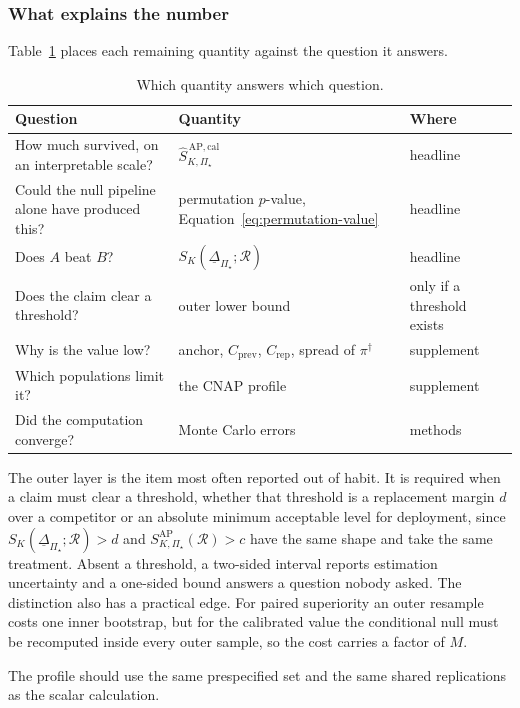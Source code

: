\documentclass[11pt]{article}
\newcommand{\Regime}{\mathcal{R}}
\newcommand{\PSet}{\Pi_\star}
\newcommand{\RobDelta}{\underline{\Delta}_{\PSet}}
\newcommand{\SRob}{S_{K,\PSet}^{\mathrm{AP}}(\Regime)}
\newcommand{\SRobCalHat}{\widehat S_{K,\PSet}^{\,\mathrm{AP,cal}}}
\theoremstyle{remark}
\begin{document}
\subsubsection*{What explains the number}

Table~\ref{tab:reporting} places each remaining quantity against the question it answers.

\begin{table}[ht]
\centering
\caption{Which quantity answers which question.}
\label{tab:reporting}
\begin{tabularx}{\textwidth}{@{}XXl@{}}
\toprule
Question & Quantity & Where \\
\midrule
How much survived, on an interpretable scale? & $\SRobCalHat$ & headline \\
Could the null pipeline alone have produced this? & permutation $p$-value, Equation~\eqref{eq:permutation-value} & headline \\
Does $A$ beat $B$? & $S_K(\RobDelta;\Regime)$ & headline \\
Does the claim clear a threshold? & outer lower bound & only if a threshold exists \\
Why is the value low? & anchor, $C_{\mathrm{prev}}$, $C_{\mathrm{rep}}$, spread of $\pi^\dagger$ & supplement \\
Which populations limit it? & the CNAP profile & supplement \\
Did the computation converge? & Monte Carlo errors & methods \\
\bottomrule
\end{tabularx}
\end{table}

The outer layer is the item most often reported out of habit. It is required when a claim must clear a threshold, whether that threshold is a replacement margin $d$ over a competitor or an absolute minimum acceptable level for deployment, since $S_K(\RobDelta;\Regime)>d$ and $\SRob>c$ have the same shape and take the same treatment. Absent a threshold, a two-sided interval reports estimation uncertainty and a one-sided bound answers a question nobody asked. The distinction also has a practical edge. For paired superiority an outer resample costs one inner bootstrap, but for the calibrated value the conditional null must be recomputed inside every outer sample, so the cost carries a factor of $M$.

The profile should use the same prespecified set and the same shared replications as the scalar calculation.
\end{document}
